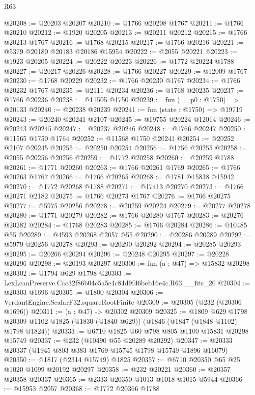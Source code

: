 \begin{lexlean}{R63}
\begin{coremodule}
@20208 := @20203 @20207
@20210 := @1766 @20208 @1767
@20211 := @1766 @20210
@20212 := @1920 @20205
@20213 := @20211 @20212
@20215 := @1766 @20213 @1767
@20216 := @1768 @20215
@20217 := @1766 @20216
@20221 := @5379 @20180 @20183 @20186 @15954
@20222 := @2055 @20221
@20223 := @1923 @20205
@20224 := @20222 @20223
@20226 := @1772 @20224 @1788
@20227 := @20217 @20226
@20228 := @1766 @20227
@20229 := @12009 @1767
@20230 := @1768 @20229
@20232 := @1766 @20230 @1767
@20234 := @1766 @20232 @1767
@20235 := @2111 @20234
@20236 := @1768 @20235
@20237 := @1766 @20236
@20238 := @11505 @1750
@20239 := fun (__p0 : @1750) => @20133
@20240 := @20238 @20239
@20241 := fun (state : @1750) => @19719
@20243 := @20240 @20241 @2107
@20245 := @19755 @20224 @12014
@20246 := @20243 @20245
@20247 := @20237 @20246
@20248 := @1766 @20247
@20250 := @11565 @1750 @1764
@20252 := @11568 @1750 @20241
@20254 := @20252 @2107 @20245
@20255 := @20250 @20254
@20256 := @1756 @20255
@20258 := @2055 @20256 @20256
@20259 := @1772 @20258
@20260 := @20259 @1788
@20261 := @1771 @20260
@20263 := @1766 @20261 @1769
@20265 := @1766 @20263 @1767
@20266 := @1766 @20265
@20268 := @1781 @15838 @15942
@20270 := @1772 @20268 @1788
@20271 := @17413 @20270
@20273 := @1766 @20271 @2182
@20275 := @1766 @20273 @1767
@20276 := @1766 @20275
@20277 := @5975 @20256
@20278 := @20259 @20224
@20279 := @20277 @20278
@20280 := @1771 @20279
@20282 := @1766 @20280 @1767
@20283 := @20276 @20282
@20284 := @1768 @20283
@20285 := @1766 @20284
@20286 := @10485 @55
@20289 := @4593 @20268 @2057 @55
@20290 := @20286 @20289
@20292 := @5979 @20256 @20278
@20293 := @20290 @20292
@20294 := @20285 @20293
@20295 := @20266 @20294
@20296 := @20248 @20295
@20297 := @20228 @20296
@20298 := @20193 @20297
@20300 := fun (a : @47) => @15832 @20298
@20302 := @1794 @629 @1798
@20303 := LexLeanPreserve.Cac32f86b04c5a5e4c84d9f46beb16e4c.R63.__fits_20
@20304 := @20303 @1696
@20305 := @1800 @20304
@20306 := VerdantEngine.ScalarF32.squareRootFinite
@20309 := @20305 (@232 (@20306 @1696))
@20311 := (a : @47) -> @20302 @20309
@20325 := @1809
    @629
    @1798
    @20309
    @1102
    @1825
    (@1830 (@1840 @629))
    (@1846 (@1847 (@1848 @1102) @1798 @1824))
@20333 := @6710 @1825 @60 @798 @805 @1100 @15831 @20298 @15749
@20337 := @232 (@10490 @55 @20289 @20292)
@20347 := @20333 @20337 (@1945 @803 @383 @1769 @15745 @1798 @15749 @1896 @16079)
@20350 := @1817 (@2314 @15749) @1825
@20357 := @6710 @20350 @65 @25 @1020 @1099 @20192 @20297
@20358 := @232 @20221
@20360 := @20357 @20358 @20337
@20365 := @2333 @20350 @1013 @1018 @1015 @5944
@20366 := @15953 @2057
@20368 := @1772 @20366 @1788

\end{coremodule}
\end{lexlean}
